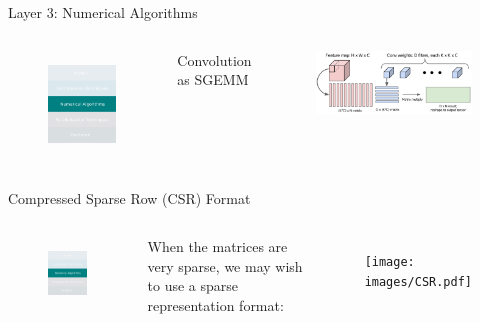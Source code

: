 \documentclass[xcolor=dvipsnames]{beamer}
\begin{document}
\begin{frame}{Layer 3: Numerical Algorithms}

\begin{columns}

\begin{figure}
    \centering
    \includegraphics[width=3.5cm]{images/numericals.pdf}
    \label{fig:inference-stack-nums-2}
\end{figure}


{\large Convolution as SGEMM \footnotemark}

\begin{figure}
    \centering
    \includegraphics[width=8cm]{images/im2col.pdf}
\end{figure}

\end{columns}

\end{frame}


\begin{frame}{Compressed Sparse Row (CSR) Format}

\begin{columns}


\begin{figure}
    \centering
    \includegraphics[width=3.5cm]{images/numericals.pdf}
    \label{fig:inference-stack-nums-3}
\end{figure}

When the matrices are very sparse, we may wish to use a sparse representation format: 

\begin{figure}
    \centering
    \texttt{[image: images/CSR.pdf]}
\end{figure}

\end{columns}
\end{frame}
\end{document}
